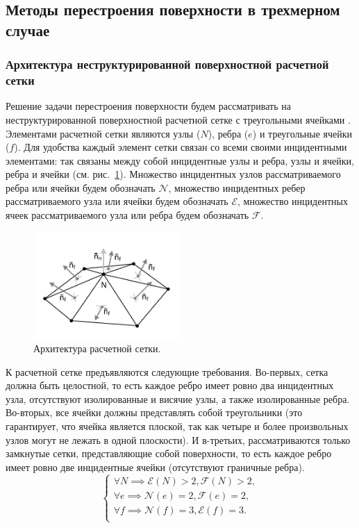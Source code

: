 \subsection{Методы перестроения поверхности в трехмерном случае}

\subsubsection{Архитектура неструктурированной поверхностной расчетной сетки}

Решение задачи перестроения поверхности будем рассматривать на неструктурированной поверхностной расчетной сетке с треугольными ячейками \cite{Meshcheryakov2023GeoEvo}.
Элементами расчетной сетки являются узлы ($N$), ребра ($e$) и треугольные ячейки ($f$).
Для удобства каждый элемент сетки связан со всеми своими инцидентными элементами: так связаны между собой инцидентные узлы и ребра, узлы и ячейки, ребра и ячейки (см. рис.~\ref{fig:text_1_remesh3_architecture}).
Множество инцидентных узлов рассматриваемого ребра или ячейки будем обозначать $\mathscr{N}$, множество инцидентных ребер рассматриваемого узла или ячейки будем обозначать $\mathscr{E}$, множество инцидентных ячеек рассматриваемого узла или ребра будем обозначать $\mathscr{F}$.

\begin{figure}[ht]
\centering
\includegraphics[width=0.5\textwidth]{pics/text_1_remesh_3d/pic_architecture.pdf}
\caption{Архитектура расчетной сетки.}
\label{fig:text_1_remesh3_architecture}
\end{figure}

К расчетной сетке предъявляются следующие требования.
Во-первых, сетка должна быть целостной, то есть каждое ребро имеет ровно два инцидентных узла, отсутствуют изолированные и висячие узлы, а также изолированные ребра.
Во-вторых, все ячейки должны представлять собой треугольники (это гарантирует, что ячейка является плоской, так как четыре и более произвольных узлов могут не лежать в одной плоскости).
И в-третьих, рассматриваются только замкнутые сетки, представляющие собой поверхности, то есть каждое ребро имеет ровно две инцидентные ячейки (отсутствуют граничные ребра).
\begin{equation}\label{eqn:text_1_remesh3_arch}
\begin{cases}
\forall N \implies \mathscr{E}(N) > 2, \mathscr{F}(N) > 2, \\
\forall e \implies \mathscr{N}(e) = 2 , \mathscr{F}(e) = 2, \\
\forall f \implies \mathscr{N}(f) = 3 , \mathscr{E}(f) = 3. \\
\end{cases}
\end{equation}

